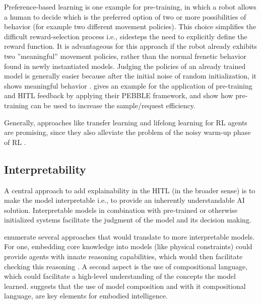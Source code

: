 \documentclass[twoside,11pt]{article}
\begin{document}
Preference-based learning is one example for pre-training, in which a robot allows a human to decide which is the preferred option of two or more possibilities of behavior (for example two different movement policies). This choice simplifies the difficult reward-selection process i.e., sidesteps the need to explicitly define the reward function. It is advantageous for this approach if the robot already exhibits two ''meaningful'' movement policies, rather than the normal frenetic behavior found in newly instantiated models. Judging the policies of an already trained model is generally easier because after the initial noise of random initialization, it shows meaningful behavior \citep{RiadEtAl:2011:PBL}. \citet{LeeSmithAbbeel:2021:FeedbackPreferenceHITLLearningPEBBLE} gives an example for the application of pre-training and HITL feedback by applying their PEBBLE framework, and show how pre-training can be used to increase the sample/request efficiency.

Generally, approaches like transfer learning and lifelong learning for RL agents are promising, since they also alleviate the problem of the noisy warm-up phase of RL \citep{taylor2009transfer,yang2021efficient}.

\subsection{Interpretability}
\label{subsec:interpretability}

A central approach to add explainability in the HITL (in the broader sense) is to make the model interpretable i.e., to provide an inherently understandable AI solution. Interpretable models in combination with pre-trained or otherwise initialized systems facilitate the judgment of the model and its decision making.

\citet{RoyEtAl:2021:RLRoboticsChallenges} enumerate several approaches that would translate to more interpretable models. For one, embedding core knowledge into models (like physical constraints) could provide agents with innate reasoning capabilities, which would then facilitate checking this reasoning \citep{HaSchmidhuber:2018:CoreKnowledgeWorldModels}. A second aspect is the use of compositional language, which could facilitate a high-level understanding of the concepts the model learned. \citet{Koditschek:2021:RoboticsCompositionalLanguage} suggests that the use of model composition and with it compositional language, are key elements for embodied intelligence.
\end{document}
